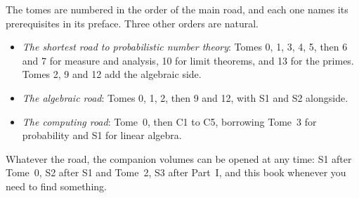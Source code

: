 The tomes are numbered in the order of the main road, and each one names its prerequisites in its preface. Three
other orders are natural.
\begin{itemize}
\item \emph{The shortest road to probabilistic number theory}: Tomes 0, 1, 3, 4, 5, then 6 and 7 for measure and
analysis, 10 for limit theorems, and 13 for the primes. Tomes 2, 9 and 12 add the algebraic side.
\item \emph{The algebraic road}: Tomes 0, 1, 2, then 9 and 12, with S1 and S2 alongside.
\item \emph{The computing road}: Tome~0, then C1 to C5, borrowing Tome~3 for probability and S1 for linear algebra.
\end{itemize}
Whatever the road, the companion volumes can be opened at any time: S1 after Tome~0, S2 after S1 and Tome~2, S3 after
Part~I, and this book whenever you need to find something.

